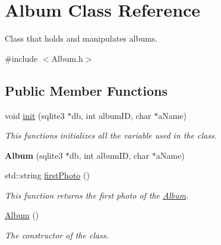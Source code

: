 \hypertarget{classAlbum}{\section{Album Class Reference}
\label{d1/d31/classAlbum}
}


Class that holds and manipulates albums.  




{\ttfamily \#include $<$Album.\-h$>$}

\subsection*{Public Member Functions}
\begin{DoxyCompactItemize}
\item 
void \hyperlink{classAlbum_a2b59f90cc3da8dd029485c46c02c161a}{init} (sqlite3 $\ast$db, int album\-I\-D, char $\ast$a\-Name)
\begin{DoxyCompactList}\small\item\em This functions initializes all the variable used in the class. \end{DoxyCompactList}\item 
\hypertarget{classAlbum_aac7b24c22383a6a7bd849d765d493696}{{\bfseries Album} (sqlite3 $\ast$db, int album\-I\-D, char $\ast$a\-Name)}\label{d1/d31/classAlbum_aac7b24c22383a6a7bd849d765d493696}

\item 
\hypertarget{classAlbum_a3543f089d2c4cb0b1fcb034170254e52}{std\-::string \hyperlink{classAlbum_a3543f089d2c4cb0b1fcb034170254e52}{first\-Photo} ()}\label{d1/d31/classAlbum_a3543f089d2c4cb0b1fcb034170254e52}

\begin{DoxyCompactList}\small\item\em This function returns the first photo of the \hyperlink{classAlbum}{Album}. \end{DoxyCompactList}\item 
\hyperlink{classAlbum_a5442b9cbed3b590e2e1151a9f262dd7a}{Album} ()
\begin{DoxyCompactList}\small\item\em The constructor of the class. \end{DoxyCompactList}\end{DoxyCompactItemize}
